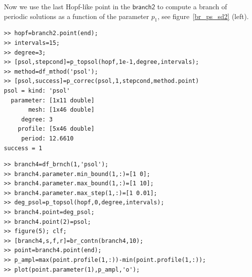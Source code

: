 \documentclass[10pt]{article}
\gdef \parm#1{{\mathsf{#1}}}
\begin{document}
{Now we use the last Hopf-like point in the $\parm{branch2}$ 
to compute a branch of periodic solutions as a function of 
the parameter $p_1$, see figure~\ref{br_ps_sd2} (left).
{\small\begin{verbatim}
>> hopf=branch2.point(end);
>> intervals=15;
>> degree=3;
>> [psol,stepcond]=p_topsol(hopf,1e-1,degree,intervals);
>> method=df_mthod('psol');
>> [psol,success]=p_correc(psol,1,stepcond,method.point)
psol = kind: 'psol'
  parameter: [1x11 double]
       mesh: [1x46 double]
     degree: 3
    profile: [5x46 double]
     period: 12.6610
success = 1
\end{verbatim}}

{\small\begin{verbatim}
>> branch4=df_brnch(1,'psol');
>> branch4.parameter.min_bound(1,:)=[1 0];
>> branch4.parameter.max_bound(1,:)=[1 10];
>> branch4.parameter.max_step(1,:)=[1 0.01];
>> deg_psol=p_topsol(hopf,0,degree,intervals);
>> branch4.point=deg_psol;
>> branch4.point(2)=psol;
>> figure(5); clf;
>> [branch4,s,f,r]=br_contn(branch4,10);
>> point=branch4.point(end);
>> p_ampl=max(point.profile(1,:))-min(point.profile(1,:));
>> plot(point.parameter(1),p_ampl,'o');
\end{verbatim}}
\begin{figure}[h]
\begin{center}

\end{center}
\end{figure}}
\end{document}
